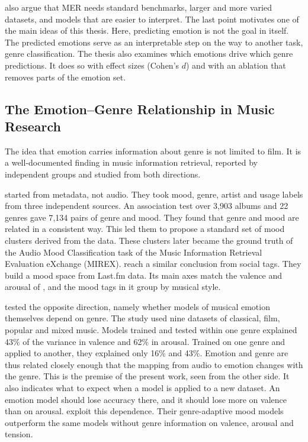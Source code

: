 \citeauthor{kang2025there} also argue that MER needs standard benchmarks, larger and more varied datasets, and models that are easier to interpret. The last point motivates one of the main ideas of this thesis. Here, predicting emotion is not the goal in itself. The predicted emotions serve as an interpretable step on the way to another task, genre classification. The thesis also examines which emotions drive which genre predictions. It does so with effect sizes (Cohen's $d$) and with an ablation that removes parts of the emotion set.

\subsection{The Emotion--Genre Relationship in Music Research}
\label{subsec:relwork_emotion_genre}

The idea that emotion carries information about genre is not limited to film. It is a well-documented finding in music information retrieval, reported by independent groups and studied from both directions.

\citet{hu2007exploring} started from metadata, not audio. They took mood, genre, artist and usage labels from three independent sources. An association test over 3{,}903 albums and 22 genres gave 7{,}134 pairs of genre and mood. They found that genre and mood are related in a consistent way. This led them to propose a standard set of mood clusters derived from the data. These clusters later became the ground truth of the Audio Mood Classification task of the Music Information Retrieval Evaluation eXchange (MIREX). \citet{laurier2009mood} reach a similar conclusion from social tags. They build a mood space from Last.fm data. Its main axes match the valence and arousal of \citet{russell1980circumplex}, and the mood tags in it group by musical style.

\citet{eerola2011genrespecific} tested the opposite direction, namely whether models of musical emotion themselves depend on genre. The study used nine datasets of classical, film, popular and mixed music. Models trained and tested within one genre explained 43\% of the variance in valence and 62\% in arousal. Trained on one genre and applied to another, they explained only 16\% and 43\%. Emotion and genre are thus related closely enough that the mapping from audio to emotion changes with the genre. This is the premise of the present work, seen from the other side. It also indicates what to expect when a model is applied to a new dataset. An emotion model should lose accuracy there, and it should lose more on valence than on arousal. \citet{saari2016genre} exploit this dependence. Their genre-adaptive mood models outperform the same models without genre information on valence, arousal and tension.

